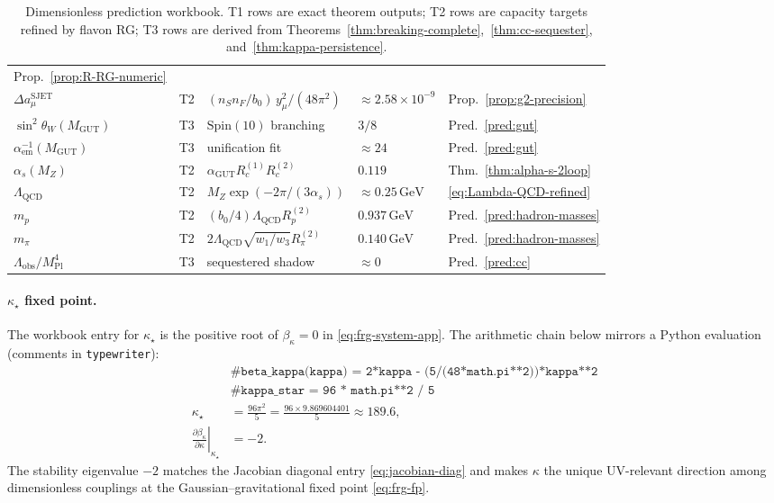\documentclass[11pt]{article}
\theoremstyle{plain}
\theoremstyle{definition}
\theoremstyle{remark}
\numberwithin{equation}{section}
\newcommand{\Spin}{\mathrm{Spin}}
\newcommand{\MPl}{M_{\mathrm{Pl}}}
\begin{document}
\begin{table}[ht]
\begin{tabular}{@{}lllll@{}}
Prop.~\ref{prop:R-RG-numeric} \\
$\Delta a_\mu^{\mathrm{SJET}}$ & T2 &
$(n_S n_F/b_0)\,y_\mu^2/(48\pi^2)$ &
$\approx 2.58\times10^{-9}$ &
Prop.~\ref{prop:g2-precision} \\
$\sin^2\theta_W(M_{\mathrm{GUT}})$ & T3 & $\Spin(10)$ branching & $3/8$ &
Pred.~\ref{pred:gut} \\
$\alpha_{\mathrm{em}}^{-1}(M_{\mathrm{GUT}})$ & T3 & unification fit &
$\approx 24$ &
Pred.~\ref{pred:gut} \\
$\alpha_s(M_Z)$ & T2 & $\alpha_{\mathrm{GUT}} R_c^{(1)} R_c^{(2)}$ & $0.119$ &
Thm.~\ref{thm:alpha-s-2loop} \\
$\Lambda_{\mathrm{QCD}}$ & T2 & $M_Z \exp(-2\pi/(3\alpha_s))$ & $\approx0.25\,\mathrm{GeV}$ &
\eqref{eq:Lambda-QCD-refined} \\
$m_p$ & T2 & $(b_0/4)\Lambda_{\mathrm{QCD}} R_p^{(2)}$ & $0.937\,\mathrm{GeV}$ &
Pred.~\ref{pred:hadron-masses} \\
$m_\pi$ & T2 & $2\Lambda_{\mathrm{QCD}}\sqrt{w_1/w_3} R_\pi^{(2)}$ & $0.140\,\mathrm{GeV}$ &
Pred.~\ref{pred:hadron-masses} \\
$\Lambda_{\mathrm{obs}}/\MPl^4$ & T3 & sequestered shadow &
$\approx 0$ &
Pred.~\ref{pred:cc} \\
\bottomrule
\end{tabular}
\caption{Dimensionless prediction workbook. T1 rows are exact theorem outputs;
T2 rows are capacity targets refined by flavon RG; T3 rows are derived from
Theorems~\ref{thm:breaking-complete},~\ref{thm:cc-sequester},
and~\ref{thm:kappa-persistence}.}
\label{tab:numerical-workbook}
\end{table}

\paragraph{$\kappa_\star$ fixed point.}
The workbook entry for $\kappa_\star$ is the positive root of
$\beta_\kappa=0$ in \eqref{eq:frg-system-app}. The arithmetic chain below
mirrors a Python evaluation (comments in \texttt{typewriter}):
\begin{equation}\label{eq:workbook-kappa}
\begin{aligned}
  &\texttt{\# beta\_kappa(kappa) = 2*kappa - (5/(48*math.pi**2))*kappa**2}\\
  &\texttt{\# kappa\_star = 96 * math.pi**2 / 5}\\
  \kappa_\star
  &= \frac{96\pi^2}{5}
  = \frac{96\times 9.869604401}{5}
  \approx 189.6,\\
  \left.\frac{\partial\beta_\kappa}{\partial\kappa}\right|_{\kappa_\star}
  &= -2.
\end{aligned}
\end{equation}
The stability eigenvalue $-2$ matches the Jacobian diagonal entry
\eqref{eq:jacobian-diag} and makes $\kappa$ the unique UV-relevant direction
among dimensionless couplings at the Gaussian--gravitational fixed point
\eqref{eq:frg-fp}.
\end{document}
